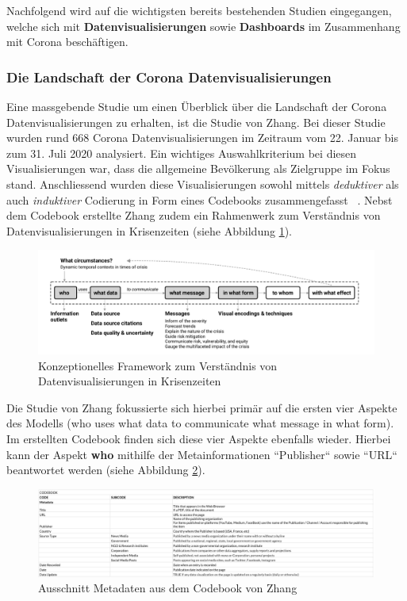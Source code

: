 Nachfolgend wird auf die wichtigsten bereits bestehenden Studien eingegangen, welche sich mit  \textbf{Datenvisualisierungen} sowie \textbf{Dashboards} im Zusammenhang mit Corona beschäftigen.
 
 \subsubsection{Die Landschaft der Corona Datenvisualisierungen}
 Eine massgebende Studie um einen Überblick über die Landschaft der Corona Datenvisualisierungen zu erhalten, ist die Studie von Zhang. Bei dieser Studie wurden rund 668 Corona Datenvisualisierungen im Zeitraum vom 22. Januar bis zum 31. Juli 2020 analysiert. Ein wichtiges Auswahlkriterium bei diesen Visualisierungen war, dass die allgemeine Bevölkerung als Zielgruppe im Fokus stand. Anschliessend wurden diese Visualisierungen sowohl mittels \textit{deduktiver} als auch \textit{induktiver} Codierung in Form eines Codebooks zusammengefasst ~\citep[S. 3]{yixuan_zhang}. Nebst dem Codebook erstellte Zhang zudem ein Rahmenwerk zum Verständnis von Datenvisualisierungen in Krisenzeiten (siehe Abbildung \ref{fig:zhang_conceptual_framework}).
 
 
 \begin{figure}[h]
    \includegraphics[width=12cm]{images/zhang_conceptual_framework.png}
    \centering
    \caption{Konzeptionelles Framework zum Verständnis von Datenvisualisierungen in Krisenzeiten ~\citep[S. 4]{yixuan_zhang}}
    \label{fig:zhang_conceptual_framework}
\end{figure}
 
 
 Die Studie von Zhang fokussierte sich hierbei primär auf die ersten vier Aspekte des Modells (who uses what data to communicate what message in what form). Im erstellten Codebook finden sich diese vier Aspekte ebenfalls wieder. Hierbei kann der Aspekt \textbf{who} mithilfe der Metainformationen ``Publisher`` sowie ``URL`` beantwortet werden (siehe Abbildung \ref{fig:zhang_codebook_metadata}).
 
 \begin{figure}[h]
    \includegraphics[width=12cm]{images/zhang_codebook_metadata.png}
    \centering
    \caption{Ausschnitt Metadaten aus dem Codebook von Zhang ~\citep{zhang_codebook}}
    \label{fig:zhang_codebook_metadata}
\end{figure}

